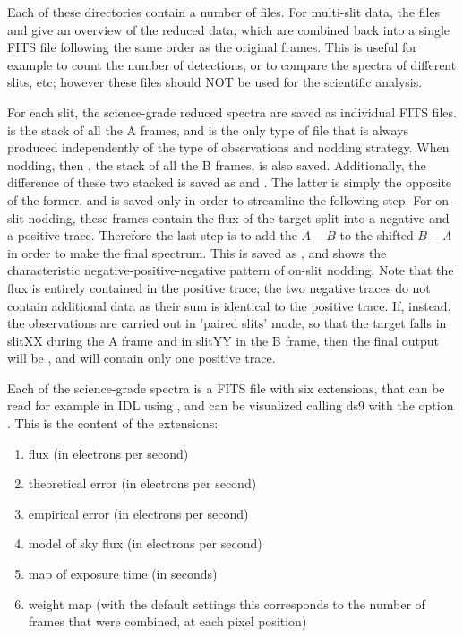 \documentclass[a4paper]{article}
\begin{document}
\begin{sloppypar}
Each of these directories contain a number of files. For multi-slit data, the files  and  give an overview of the reduced data, which are combined back into a single FITS file following the same order as the original frames. This is useful for example to count the number of detections, or to compare the spectra of different slits, etc; however these files should NOT be used for the scientific analysis.

For each slit, the science-grade reduced spectra are saved as individual FITS files.  is the stack of all the A frames, and is the only type of file that is always produced independently of the type of observations and nodding strategy. When nodding, then , the stack of all the B frames, is also saved. Additionally, the difference of these two stacked is saved as  and . The latter is simply the opposite of the former, and is saved only in order to streamline the following step. For on-slit nodding, these frames contain the flux of the target split into a negative and a positive trace. Therefore the last step is to add the $A-B$ to the shifted $B-A$ in order to make the final spectrum. This is saved as , and shows the characteristic negative-positive-negative pattern of on-slit nodding. Note that the flux is entirely contained in the positive trace; the two negative traces do not contain additional data as their sum is identical to the positive trace. If, instead, the observations are carried out in 'paired slits' mode, so that the target falls in slitXX during the A frame and in slitYY in the B frame, then the final output will be , and will contain only one positive trace.

Each of the science-grade spectra is a FITS file with six extensions, that can be read for example in IDL using , and can be visualized calling ds9 with the option . This is the content of the extensions:
\begin{enumerate}
\item flux (in electrons per second)
\item theoretical error (in electrons per second)
\item empirical error (in electrons per second)
\item model of sky flux (in electrons per second)
\item map of exposure time (in seconds)
\item weight map (with the default settings this corresponds to the number of frames that were combined, at each pixel position)
\end{enumerate}


\end{sloppypar}
\end{document}
